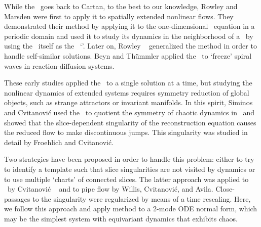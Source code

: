 While the \mslices\ goes back to Cartan, to the
best to our knowledge, Rowley and Marsden
were first to apply it to spatially extended nonlinear flows.
They demonstrated their method by applying it to the one-dimensional \KS\ equation
in a periodic domain and used it to study its dynamics in the neighborhood of
a \reqv\ by using the \reqv\ itself as the \slice\ `\template'. Later on,
Rowley \etal~ generalized the method in order
to handle self-similar solutions. Beyn and Th\"{u}mmler applied
the \mslices\ to `freeze' spiral waves in reaction-diffusion systems.

These early studies applied the \mslices\ to a single solution at a time, but
studying the nonlinear dynamics of extended systems requires symmetry reduction
of global objects, such as strange attractors or invariant manifolds.
In this spirit, Siminos and Cvitanovi\'{c} used the \mslices\ to
quotient the  symmetry of chaotic dynamics in \cLf\ and showed that the
slice-dependent singularity of the reconstruction equation
causes the reduced flow to make discontinuous jumps. This singularity was studied
in detail by Froehlich and Cvitanovi\'{c}.

Two strategies have been proposed in order to handle this problem: either to
try to identify a template such that slice singularities are not visited
by dynamics or to use multiple `charts' of connected
slices.
The latter approach was applied to \cLf\ by Cvitanovi\'{c} \etal~ and
to pipe flow by Willis, Cvitanovi\'{c}, and Avila.
Close-passages to the
singularity were regularized by means of a time rescaling. Here, we follow this approach
and apply \ESedit{this so-called ``first Fourier mode slice''} method
to a 2-mode ODE normal form, which may be
the simplest system with  equivariant dynamics
that exhibits chaos.

